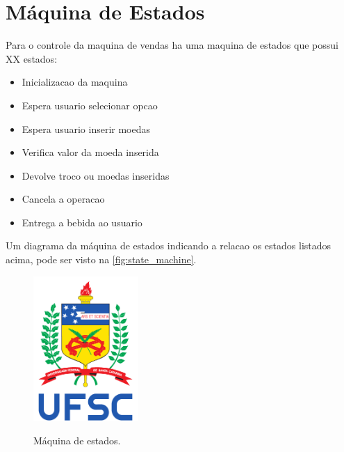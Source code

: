%
%
%
%
%

%
%
%
%
%

\section{Máquina de Estados} \label{sec:state_machine}

Para o controle da maquina de vendas ha uma maquina de estados que possui XX estados:

\begin{itemize}
    \item Inicializacao da maquina
    \item Espera usuario selecionar opcao
    \item Espera usuario inserir moedas
    \item Verifica valor da moeda inserida
    \item Devolve troco ou moedas inseridas
    \item Cancela a operacao
    \item Entrega a bebida ao usuario
\end{itemize}

Um diagrama da máquina de estados indicando a relacao os estados listados acima, pode ser visto na \autoref{fig:state_machine}.

\begin{figure}[!ht]
    \begin{center}
        \includegraphics[width=4cm]{figures/ufsc.pdf}
        \label{fig:state_machine}
        \caption{Máquina de estados.}
    \end{center}
\end{figure}
